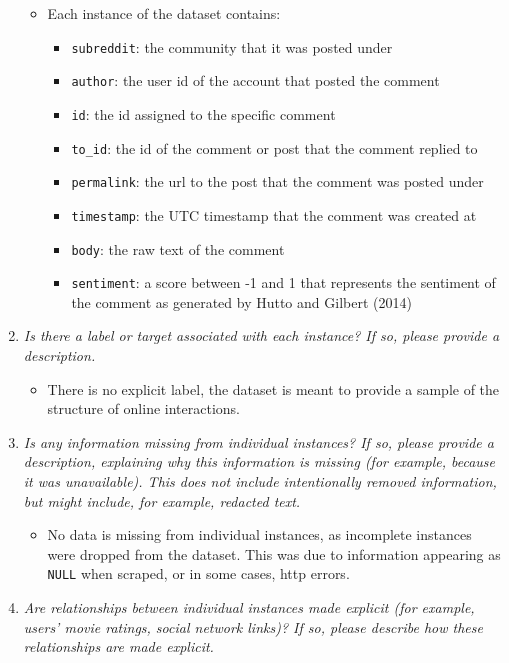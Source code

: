 \documentclass[
]{article}
\providecommand{\tightlist}{%
  \setlength{\itemsep}{0pt}\setlength{\parskip}{0pt}}
\begin{document}
\begin{enumerate}
  \begin{itemize}
  \tightlist
  \item
    Each instance of the dataset contains:

    \begin{itemize}
    \tightlist
    \item
      \texttt{subreddit}: the community that it was posted under
    \item
      \texttt{author}: the user id of the account that posted the comment
    \item
      \texttt{id}: the id assigned to the specific comment
    \item
      \texttt{to\_id}: the id of the comment or post that the comment replied to
    \item
      \texttt{permalink}: the url to the post that the comment was posted under
    \item
      \texttt{timestamp}: the UTC timestamp that the comment was created at
    \item
      \texttt{body}: the raw text of the comment
    \item
      \texttt{sentiment}: a score between -1 and 1 that represents the sentiment of the comment as generated by Hutto and Gilbert (2014)
    \end{itemize}
  \end{itemize}
\item
  \emph{Is there a label or target associated with each instance? If so, please provide a description.}

  \begin{itemize}
  \tightlist
  \item
    There is no explicit label, the dataset is meant to provide a sample of the structure of online interactions.
  \end{itemize}
\item
  \emph{Is any information missing from individual instances? If so, please provide a description, explaining why this information is missing (for example, because it was unavailable). This does not include intentionally removed information, but might include, for example, redacted text.}

  \begin{itemize}
  \tightlist
  \item
    No data is missing from individual instances, as incomplete instances were dropped from the dataset. This was due to information appearing as \texttt{NULL} when scraped, or in some cases, http errors.
  \end{itemize}
\item
  \emph{Are relationships between individual instances made explicit (for example, users' movie ratings, social network links)? If so, please describe how these relationships are made explicit.}


\end{enumerate}
\end{document}
